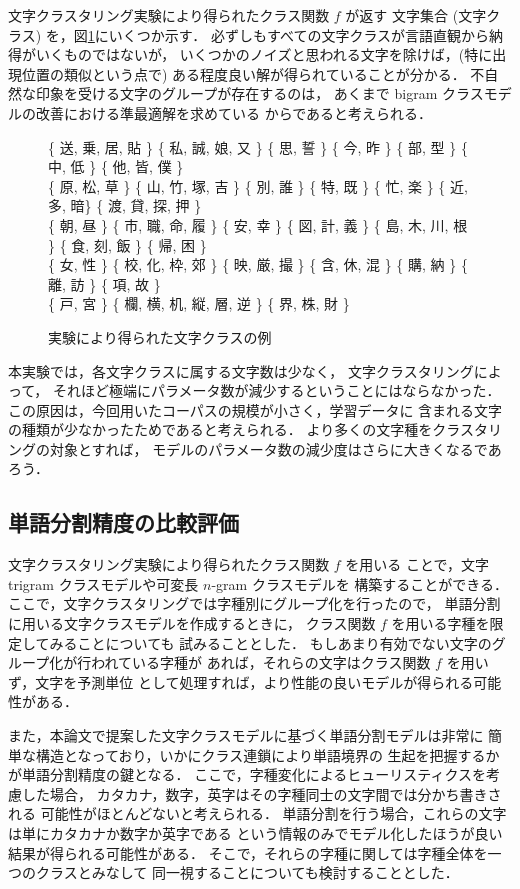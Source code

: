 文字クラスタリング実験により得られたクラス関数 $f$ が返す
文字集合 (文字クラス) を，図\ref{Fig:ExampleCharClass}にいくつか示す．
必ずしもすべての文字クラスが言語直観から納得がいくものではないが，
いくつかのノイズと思われる文字を除けば，(特に出現位置の類似という点で)
ある程度良い解が得られていることが分かる．
不自然な印象を受ける文字のグループが存在するのは，
あくまで bigram クラスモデルの改善における準最適解を求めている
からであると考えられる．
\begin{figure}[hbt]
\{ 送, 乗, 居, 貼 \}
\{ 私, 誠, 娘, 又 \}
\{ 思, 誓 \}
\{ 今, 昨 \}
\{ 部, 型 \}
\{ 中, 低 \}
\{ 他, 皆, 僕 \}\\
\{ 原, 松, 草 \}
\{ 山, 竹, 塚, 吉 \}
\{ 別, 誰 \}
\{ 特, 既 \}
\{ 忙, 楽 \}
\{ 近, 多, 暗\}
\{ 渡, 貸, 探, 押 \}\\
\{ 朝, 昼 \}
\{ 市, 職, 命, 履 \}
\{ 安, 幸 \}
\{ 図, 計, 義 \}
\{ 島, 木, 川, 根 \}
\{ 食, 刻, 飯 \}
\{ 帰, 困 \}\\
\{ 女, 性 \}
\{ 校, 化, 枠, 郊 \}
\{ 映, 厳, 撮 \}
\{ 含, 休, 混 \}
\{ 購, 納 \}
\{ 離, 訪 \}
\{ 項, 故 \}\\
\{ 戸, 宮 \}
\{ 欄, 横, 机, 縦, 層, 逆 \}
\{ 界, 株, 財 \}
\caption{実験により得られた文字クラスの例}
\label{Fig:ExampleCharClass}
\end{figure}

本実験では，各文字クラスに属する文字数は少なく，
文字クラスタリングによって，
それほど極端にパラメータ数が減少するということにはならなかった．
この原因は，今回用いたコーパスの規模が小さく，学習データに
含まれる文字の種類が少なかったためであると考えられる．
より多くの文字種をクラスタリングの対象とすれば，
モデルのパラメータ数の減少度はさらに大きくなるであろう．

\subsection{単語分割精度の比較評価}
\vspace{-1.5mm}
文字クラスタリング実験により得られたクラス関数 $f$ を用いる
ことで，文字 trigram クラスモデルや可変長 $n$-gram クラスモデルを
構築することができる．
ここで，文字クラスタリングでは字種別にグループ化を行ったので，
単語分割に用いる文字クラスモデルを作成するときに，
クラス関数 $f$ を用いる字種を限定してみることについても
試みることとした．
もしあまり有効でない文字のグループ化が行われている字種が
あれば，それらの文字はクラス関数 $f$ を用いず，文字を予測単位
として処理すれば，より性能の良いモデルが得られる可能性がある．

また，本論文で提案した文字クラスモデルに基づく単語分割モデルは非常に
簡単な構造となっており，いかにクラス連鎖により単語境界の
生起を把握するかが単語分割精度の鍵となる．
ここで，字種変化によるヒューリスティクスを考慮した場合，
カタカナ，数字，英字はその字種同士の文字間では分かち書きされる
可能性がほとんどないと考えられる．
単語分割を行う場合，これらの文字は単にカタカナか数字か英字である
という情報のみでモデル化したほうが良い結果が得られる可能性がある．
そこで，それらの字種に関しては字種全体を一つのクラスとみなして
同一視することについても検討することとした．

